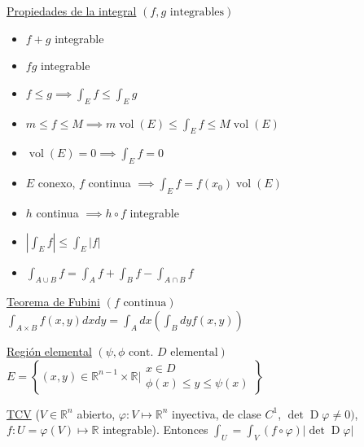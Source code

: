 \documentclass[12pt]{article}
\newcommand{\real}{\mathbb{R}}
\newcommand\setb[1]{\left\{#1\right\}}
\newcommand{\abs}[1]{\left\vert #1 \right\vert}
\DeclareMathOperator{\vol}{vol}
\DeclareMathOperator{\D}{D}
\begin{document}
\begin{multicols}{3}
\underline{Propiedades de la integral} $\left( f,g \text{ integrables} \right)$
\begin{itemize}
	\itemsep0em
	\item $f+g$ integrable
	\item $fg$ integrable
	\item $f \leq g \implies \int_E f \leq \int_E g$ 
	\item $m \leq f \leq M \implies m\vol(E) \leq \int_E f \leq M\vol(E)$
	\item $\vol(E)=0 \implies \int_E f = 0$
	\item $E$ conexo, $f$ continua $\implies \int_E f = f(x_0)\vol(E)$
	\item $h$ continua $\implies h \circ f$ integrable
	\item $\abs{\int_E f} \leq \int_E \abs{f}$
	\item $\int_{A \cup B} f = \int_A f + \int_B f - \int_{A \cap B} f$
\end{itemize}

\underline{Teorema de Fubini} $\left( f \text{ continua} \right)$
$\int_{A\times B} f(x,y) dx dy = \int_A dx \left( \int_B dy f(x,y) \right)$

\underline{Región elemental} $\left( \psi, \phi \text{ cont. } D \text{ elemental} \right)$
$E = \setb{(x,y) \in \real^{n-1} \times \real \vert \substack{x \in D \\
		\phi(x) \leq y \leq \psi(x)}}$
		
\underline{TCV}
($V \in \real^n$ abierto, $\varphi \colon V \mapsto \real^n$ inyectiva, de clase $C^1$, 
$\det \D\varphi \neq 0)$, $f \colon U=\varphi(V) \mapsto \real$ integrable). Entonces
$\int_U = \int_V (f \circ \varphi) |\det \D \varphi|$
\end{multicols}
\end{document}
